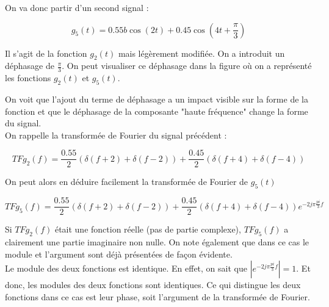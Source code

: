 \documentclass[11pt,a4paper]{article}
\begin{document}
On va donc partir d'un second signal :

\[ g_5(t) = 0.55b\cos(2 t) + 0.45 \cos(4 t + \frac{\pi}{3}) \] 

Il s'agit de la fonction $g_2(t)$ mais légèrement modifiée. On a introduit un déphasage de $\frac{\pi}{3}$. On peut visualiser ce déphasage dans la figure où on a représenté les fonctions $g_2(t)$ et $g_5(t)$.


\begin{center}
\end{center}
On voit que l'ajout du terme de déphasage a un impact visible sur la forme de la fonction et que le déphasage de la composante "haute fréquence" change la forme du signal.\\

On rappelle la transformée de Fourier du signal précédent :

\[ TF{g_2}(f) =   \frac{0.55}{2}(\delta(f+2) + \delta(f-2)) + \frac{0.45}{2}(\delta(f+4) + \delta(f-4))\]

On peut alors en déduire facilement la transformée de Fourier de $g_5(t)$

\[ TF{g_5}(f) =   \frac{0.55}{2}(\delta(f+2) + \delta(f-2)) + \frac{0.45}{2}(\delta(f+4) + \delta(f-4))e^{-2 j \pi \frac{pi}{3} f }\]

Si $TF{g_2}(f)$ était une fonction réelle (pas de partie complexe), $TF{g_5}(f)$ a clairement une partie imaginaire non nulle. On note également que dans ce cas le module et l'argument sont déjà présentées de façon évidente.\\

Le module des deux fonctions est identique. En effet, on sait que $|e^{-2 j \pi \frac{pi}{3} f }|=1$. Et donc, les modules des deux fonctions sont identiques. Ce qui distingue les deux fonctions dans ce cas est leur phase, soit l'argument de la transformée de Fourier. 
\end{document}
